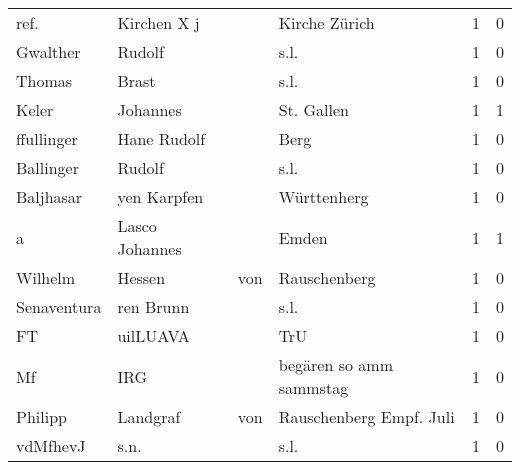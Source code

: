 \begin{center}
\begin{tiny}
\begin{longtabu}{llllrr}
                     ref. &                        Kirchen X j &             &                               Kirche Zürich &          1 &         0 \\
                 Gwalther &                             Rudolf &             &                                        s.l. &          1 &         0 \\
                   Thomas &                              Brast &             &                                        s.l. &          1 &         0 \\
                    Keler &                           Johannes &             &                                  St. Gallen &          1 &         1 \\
               ffullinger &                        Hane Rudolf &             &                                        Berg &          1 &         0 \\
                Ballinger &                             Rudolf &             &                                        s.l. &          1 &         0 \\
                Baljhasar &                        yen Karpfen &             &                                 Württenherg &          1 &         0 \\
                        a &                     Lasco Johannes &             &                                       Emden &          1 &         1 \\
                  Wilhelm &                             Hessen &         von &                                Rauschenberg &          1 &         0 \\
              Senaventura &                          ren Brunn &             &                                        s.l. &          1 &         0 \\
                       FT &                           uilLUAVA &             &                                         TrU &          1 &         0 \\
                       Mf &                                IRG &             &                     begären so amm sammstag &          1 &         0 \\
                  Philipp &                           Landgraf &         von &                     Rauschenberg Empf. Juli &          1 &         0 \\
                 vdMfhevJ &                               s.n. &             &                                        s.l. &          1 &         0 \\

\end{longtabu}
\end{tiny}
\end{center}
